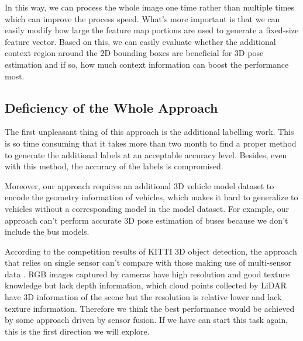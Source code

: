 In this way, we can process the whole image one time rather than multiple times which can improve the process speed. What's more important is that we can easily modify how large the feature map portions are used to generate a fixed-size feature vector. Based on this, we can easily evaluate whether the additional context region around the 2D bounding boxes are beneficial for 3D pose estimation and if so, how much context information can boost the performance most.  


\subsection{Deficiency of the Whole Approach}
The first unpleasant thing of this approach is the additional labelling work. This is so time consuming that it takes more than two month to find a proper method to generate the additional labels at an acceptable accuracy level. Besides, even with this method, the accuracy of the labels is compromised.

Moreover, our approach requires an additional 3D vehicle model dataset to encode the geometry information of vehicles, which makes it hard to generalize to vehicles without a corresponding model in the model dataset. For example, our approach can't perform accurate 3D pose estimation of buses because we don't include the bus models.

According to the competition results of KITTI 3D object detection, the approach that relies on single sensor can't compare with those making use of multi-sensor data \cite{3dobject}. RGB images captured by cameras have high resolution and good texture knowledge but lack depth information, which cloud points collected by LiDAR have 3D information of the scene but the resolution is relative lower and lack texture information. Therefore we think the best performance would be achieved by some approach driven by sensor fusion. If we have can start this task again, this is the first direction we will explore.





